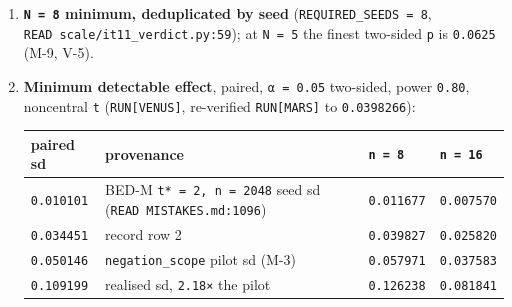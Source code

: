 \documentclass[11pt,a4paper]{article}
\newcounter{none}                 %
\theoremstyle{plain}
\theoremstyle{definition}
\theoremstyle{remark}
\begin{document}
\begin{enumerate}
\def\labelenumi{\arabic{enumi}.}
\item
  \textbf{\texttt{N\ =\ 8} minimum, deduplicated by seed}
  (\texttt{REQUIRED\_SEEDS\ =\ 8},
  \texttt{READ\ scale/it11\_verdict.py:59}); at \texttt{N\ =\ 5} the
  finest two-sided \texttt{p} is \texttt{0.0625} (M-9, V-5).
\item
  \textbf{Minimum detectable effect}, paired, \texttt{α\ =\ 0.05}
  two-sided, power \texttt{0.80}, noncentral \texttt{t}
  (\texttt{RUN{[}VENUS{]}}, re-verified \texttt{RUN{[}MARS{]}} to
  \texttt{0.0398266}):

  {\def\LTcaptype{none} %
  \begin{longtable}[]{@{}
    >{\raggedright\arraybackslash}p{}
    >{\raggedright\arraybackslash}p{}
    >{\raggedright\arraybackslash}p{}
    >{\raggedright\arraybackslash}p{}@{}}
  \toprule\noalign{}
  \begin{minipage}[b]{\linewidth}\raggedright
  paired sd
  \end{minipage} & \begin{minipage}[b]{\linewidth}\raggedright
  provenance
  \end{minipage} & \begin{minipage}[b]{\linewidth}\raggedright
  \texttt{n\ =\ 8}
  \end{minipage} & \begin{minipage}[b]{\linewidth}\raggedright
  \texttt{n\ =\ 16}
  \end{minipage} \\
  \midrule\noalign{}
  \endhead
  \bottomrule\noalign{}
  \endlastfoot
  \texttt{0.010101} & BED-M \texttt{t*\ =\ 2,\ n\ =\ 2048} seed sd
  (\texttt{READ\ MISTAKES.md:1096}) & \texttt{0.011677} &
  \texttt{0.007570} \\
  \texttt{0.034451} & record row 2 & \texttt{0.039827} &
  \texttt{0.025820} \\
  \texttt{0.050146} & \texttt{negation\_scope} pilot sd (M-3) &
  \texttt{0.057971} & \texttt{0.037583} \\
  \texttt{0.109199} & realised sd, \texttt{2.18×} the pilot &
  \texttt{0.126238} & \texttt{0.081841} \\
  \end{longtable}
  }


\end{enumerate}
\end{document}
